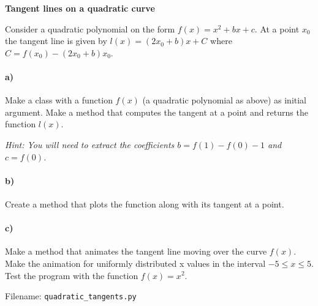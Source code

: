 \begin{Problem}{\textbf{Tangent lines on a quadratic curve}} \label{prob73}

\noindent Consider a quadratic polynomial on the form $f(x)=x^2+bx+c$. At a point $x_0$ the
tangent line is given by $l(x)=(2x_0+b)x +C$ where $C=f(x_0)-(2x_0+b)x_0$.
\paragraph{a)}
Make a class  with a function $f(x)$ (a quadratic polynomial as above) as initial
argument. Make a method that computes the tangent at a point and returns the function
$l(x)$.

\emph{Hint: You will need to extract the coefficients $b=f(1)-f(0)-1$ and
$c=f(0)$.}
\paragraph{b)}
Create a method that plots the function along with its tangent at a point.
\paragraph{c)}
Make a method that animates the tangent line moving over the curve $f(x)$. Make
the animation for uniformly distributed x values in the interval $-5 \leq x \leq 5$.
Test the program with the function $f(x)=x^2$.

Filename: \texttt{quadratic\_tangents.py}
\end{Problem}


